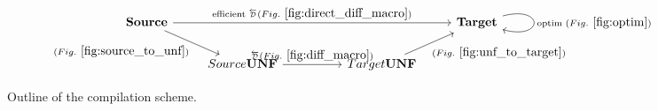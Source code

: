 \begin{figure}
\[
\begin{tikzcd}
    \Source \ar[rrrr,"\text{efficient }\Dsynrevsymbol (Fig.~\ref{fig:direct_diff_macro})"] \ar[dr,"(Fig.~\ref{fig:source_to_unf})"'] &&&& \Target \arrow[r,loop right,"\text{optim }(Fig.~\ref{fig:optim})"] \\
    & Source\UNFSymbol \ar[rr,"\Dsynrevsymbol (Fig.~\ref{fig:diff_macro})"] && Target\UNFSymbol \ar[ur,"(Fig.~\ref{fig:unf_to_target})"'] & 
\end{tikzcd}
\]
\vspace{-0.5cm}
\caption{Outline of the compilation scheme.}
\vspace{-0.5cm}
\label{fig:outline}
\end{figure}